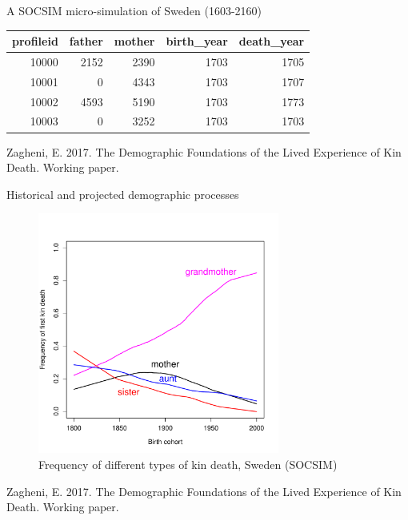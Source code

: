 \documentclass[
  ignorenonframetext,
]{beamer}
\newenvironment{Shaded}{\begin{snugshade}}{\end{snugshade}}
\newcommand{\CommentTok}[1]{\textcolor[rgb]{0.56,0.35,0.01}{\textit{#1}}}
\newcommand{\DecValTok}[1]{\textcolor[rgb]{0.00,0.00,0.81}{#1}}
\newcommand{\KeywordTok}[1]{\textcolor[rgb]{0.13,0.29,0.53}{\textbf{#1}}}
\newcommand{\NormalTok}[1]{#1}
\newcommand{\OperatorTok}[1]{\textcolor[rgb]{0.81,0.36,0.00}{\textbf{#1}}}
\newcommand{\StringTok}[1]{\textcolor[rgb]{0.31,0.60,0.02}{#1}}
\begin{document}
\begin{frame}[fragile]{A SOCSIM micro-simulation of Sweden (1603-2160)}
\protect\hypertarget{a-socsim-micro-simulation-of-sweden-1603-2160}{}

\begin{Shaded}
\end{Shaded}

\begin{longtable}[]{@{}rrrrr@{}}
\toprule
profileid & father & mother & birth\_year & death\_year\tabularnewline
\midrule
\endhead
10000 & 2152 & 2390 & 1703 & 1705\tabularnewline
10001 & 0 & 4343 & 1703 & 1707\tabularnewline
10002 & 4593 & 5190 & 1703 & 1773\tabularnewline
10003 & 0 & 3252 & 1703 & 1703\tabularnewline
\bottomrule
\end{longtable}

\tiny Zagheni, E. 2017. The Demographic Foundations of the Lived
Experience of Kin Death. Working paper.

\end{frame}

\begin{frame}{Historical and projected demographic processes}
\protect\hypertarget{historical-and-projected-demographic-processes}{}

\begin{figure}
\centering
\includegraphics[width=3.125in,height=\textheight]{resources/type_kin_death}
\caption{Frequency of different types of kin death, Sweden (SOCSIM)}
\end{figure}

\tiny Zagheni, E. 2017. The Demographic Foundations of the Lived
Experience of Kin Death. Working paper.

\end{frame}
\end{document}
